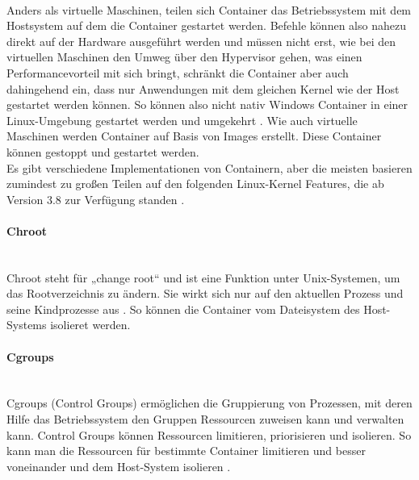 \paragraph{}
Anders als virtuelle Maschinen, teilen sich Container das Betriebssystem mit dem Hostsystem auf dem die Container gestartet werden. Befehle können also nahezu direkt auf der Hardware ausgeführt werden und müssen nicht erst, wie bei den virtuellen Maschinen den Umweg über den Hypervisor gehen, was einen Performancevorteil mit sich bringt, schränkt die Container aber auch dahingehend ein, dass nur Anwendungen mit dem gleichen Kernel wie der Host gestartet werden können. So können also nicht nativ Windows Container in einer Linux-Umgebung gestartet werden und umgekehrt \cite{7092949}. Wie auch virtuelle Maschinen werden Container auf Basis von Images erstellt. Diese Container können gestoppt und gestartet werden.\\ Es gibt verschiedene Implementationen von Containern, aber die meisten basieren zumindest zu großen Teilen auf den folgenden Linux-Kernel Features, die ab Version 3.8 zur Verfügung standen \cite{RaRo}.

\paragraph{Chroot} \mbox{} \\
\noindent Chroot steht für „change root“ und ist eine Funktion unter Unix-Systemen, um das Rootverzeichnis zu ändern. Sie wirkt sich nur auf den aktuellen Prozess und seine Kindprozesse aus \cite{wiki:chroot}. So können die Container vom Dateisystem des Host-Systems isolieret werden. 

\paragraph{Cgroups} \mbox{} \\
\noindent Cgroups (Control Groups) ermöglichen die Gruppierung von Prozessen, mit deren Hilfe das Betriebssystem den Gruppen Ressourcen zuweisen kann und verwalten kann. Control Groups können Ressourcen limitieren, priorisieren und isolieren. So kann man die Ressourcen für bestimmte Container limitieren und besser voneinander und dem Host-System isolieren \cite{7158965}.

